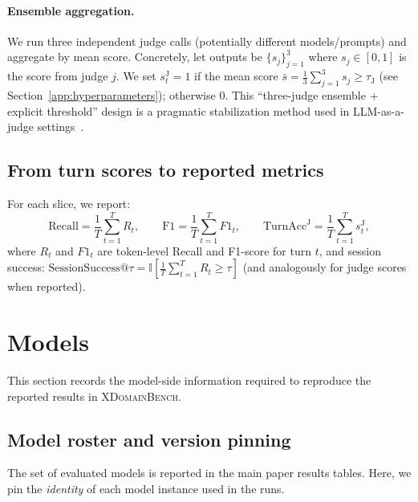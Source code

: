 \paragraph{Ensemble aggregation.}
We run three independent judge calls (potentially different models/prompts) and aggregate by mean score.
Concretely, let outputs be $\{s_j\}_{j=1}^3$ where $s_j \in [0,1]$ is the score from judge $j$.
We set $s_t^{\text{J}}=1$ if the mean score $\bar{s} = \frac{1}{3}\sum_{j=1}^3 s_j \ge \tau_{\mathrm{J}}$ (see Section~\ref{app:hyperparameters}); otherwise $0$.
This ``three-judge ensemble + explicit threshold'' design is a pragmatic stabilization method used in LLM-as-a-judge settings~\citep{zheng-etal-2023-judging,laskar-etal-2024-systematic}.

\endgroup

\subsection{From turn scores to reported metrics}
\label{app:scoring_metrics}

For each slice, we report:
\begin{equation}
\label{eq:turn_acc}
\mathrm{Recall} = \frac{1}{T}\sum_{t=1}^{T} R_t,\qquad
\mathrm{F1} = \frac{1}{T}\sum_{t=1}^{T} F1_t,\qquad
\mathrm{TurnAcc}^{\text{J}} = \frac{1}{T}\sum_{t=1}^{T} s_t^{\text{J}},
\end{equation}
where $R_t$ and $F1_t$ are token-level Recall and F1-score for turn $t$, and session success:
$\mathrm{SessionSuccess@}\tau = \mathbb{I}[\frac{1}{T}\sum_{t=1}^T R_t \ge \tau]$
(and analogously for judge scores when reported).


\section{Models}
\label{app:models}

This section records the model-side information required to reproduce the reported
results in \textsc{XDomainBench}.

\subsection{Model roster and version pinning}
\label{app:models_roster}

The set of evaluated models is reported in the main paper results tables. Here, we pin the
\emph{identity} of each model instance used in the runs.

